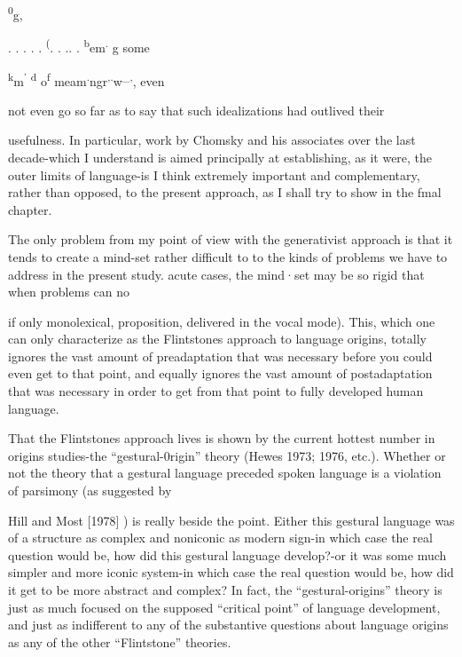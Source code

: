\textsuperscript{0}g,

\textsuperscript{{\textquotedbl}}. . . . .\textsuperscript{{\textquotedbl}} \textsuperscript{(}\textsuperscript{{\textquotedbl}}. . .. .\textsuperscript{{\textquotedbl}} \textsuperscript{b}em\textsuperscript{.} g some

\textsuperscript{k}m\textsuperscript{'} \textsuperscript{d} o\textsuperscript{f} meam\textsuperscript{.}ngr\textsuperscript{,}\textsuperscript{.}w\textsuperscript{\_}\textsuperscript{,}, even

not even go so far as to say that such idealizations had outlived their

usefulness. In particular, work by Chomsky and his associates over the last decade-which I understand is aimed principally at establishing, as it were, the outer limits of language-is I think extremely important and complementary, rather than opposed, to the present approach, as I shall try to show in the fmal chapter.

The only problem from my point of view with the generativist approach is that it tends to create a mind-set rather difficult to
to the kinds of problems we have to address in the present study. acute cases, the mind·set may be so rigid that when problems can no


if only monolexical, proposition, delivered in the vocal mode). This, which one can only characterize as the Flintstones approach to lan\-guage origins, totally ignores the vast amount of preadaptation that was necessary before you could even get to that point, and equally ignores the vast amount of postadaptation that was necessary in order to get from that point to fully developed human language.

That the Flintstones approach lives is shown by the current hottest number in origins studies-the ``gestural-0rigin'' theory (Hewes 1973; 1976, etc.). Whether or not the theory that a gestural language preceded spoken language is a violation of parsimony (as suggested by


Hill and Most [1978] ) is really beside the point. Either this gestural language was of a structure as complex and noniconic as modern sign-in which case the real question would be, how did this gestural language develop?-or it was some much simpler and more iconic system-in which case the real question would be, how did it get to be more abstract and complex? In fact, the ``gestural-origins'' theory is just as much focused on the supposed ``critical point'' of language development, and just as indifferent to any of the substantive questions about language origins as any of the other ``Flintstone'' theories.

